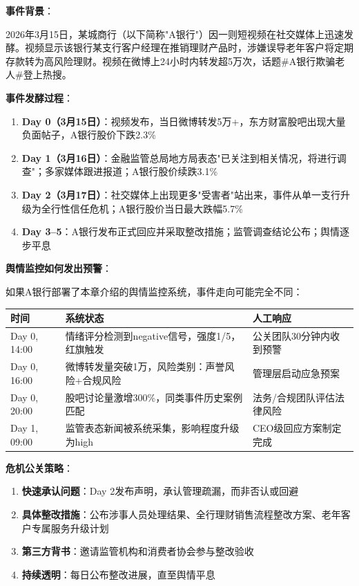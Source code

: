 \begin{casebox}

\textbf{事件背景}：

2026年3月15日，某城商行（以下简称"A银行"）因一则短视频在社交媒体上迅速发酵。视频显示该银行某支行客户经理在推销理财产品时，涉嫌误导老年客户将定期存款转为高风险理财。视频在微博上24小时内转发超5万次，话题\#A银行欺骗老人\#登上热搜。

\textbf{事件发酵过程}：

\begin{enumerate}[leftmargin=2em]
  \item \textbf{Day 0（3月15日）}：视频发布，当日微博转发5万+，东方财富股吧出现大量负面帖子，A银行股价下跌2.3\%
  \item \textbf{Day 1（3月16日）}：金融监管总局地方局表态"已关注到相关情况，将进行调查"；多家媒体跟进报道；A银行股价续跌3.1\%
  \item \textbf{Day 2（3月17日）}：社交媒体上出现更多"受害者"站出来，事件从单一支行升级为全行性信任危机；A银行股价当日最大跌幅5.7\%
  \item \textbf{Day 3--5}：A银行发布正式回应并采取整改措施；监管调查结论公布；舆情逐步平息
\end{enumerate}

\textbf{舆情监控如何发出预警}：

如果A银行部署了本章介绍的舆情监控系统，事件走向可能完全不同：

\begin{table}[H]
\centering
\begin{tabular}{llp{5cm}}
\toprule
\textbf{时间} & \textbf{系统状态} & \textbf{人工响应} \\
\midrule
Day 0, 14:00 & 情绪评分检测到negative信号，强度1/5，红旗触发 & 公关团队30分钟内收到预警 \\
Day 0, 16:00 & 微博转发量突破1万，风险类别：声誉风险+合规风险 & 管理层启动应急预案 \\
Day 0, 20:00 & 股吧讨论量激增300\%，同类事件历史案例匹配 & 法务/合规团队评估法律风险 \\
Day 1, 09:00 & 监管表态新闻被系统采集，影响程度升级为high & CEO级回应方案制定完成 \\
\bottomrule
\end{tabular}
\end{table}

\textbf{危机公关策略}：

\begin{enumerate}[leftmargin=2em]
  \item \textbf{快速承认问题}：Day 2发布声明，承认管理疏漏，而非否认或回避
  \item \textbf{具体整改措施}：公布涉事人员处理结果、全行理财销售流程整改方案、老年客户专属服务升级计划
  \item \textbf{第三方背书}：邀请监管机构和消费者协会参与整改验收
  \item \textbf{持续透明}：每日公布整改进展，直至舆情平息
\end{enumerate}


\end{casebox}
